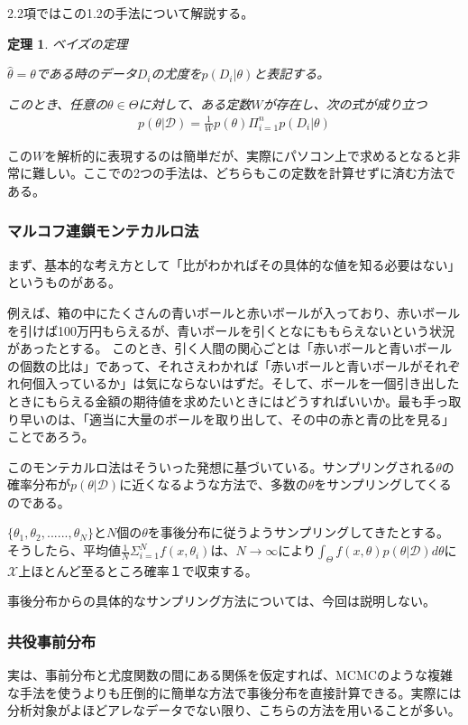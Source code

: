 \documentclass[dvipdfmx, a4paper]{jsarticle}
\newtheorem{theo}{定理}[section]
\begin{document}
2.2項ではこの1.2の手法について解説する。

\begin{theo}ベイズの定理

$\hat{\theta}=\theta$である時のデータ$D_i$の尤度を$p(D_i|\theta)$と表記する。

このとき、任意の$\theta\in\Theta$に対して、ある定数$W$が存在し、次の式が成り立つ
\begin{align}
p(\theta|\mathcal{D})=\frac{1}{W}p(\theta)\Pi^n_{i=1}p(D_i|\theta)
\end{align}
\end{theo}
この$W$を解析的に表現するのは簡単だが、実際にパソコン上で求めるとなると非常に難しい。ここでの2つの手法は、どちらもこの定数を計算せずに済む方法である。
\subsubsection{マルコフ連鎖モンテカルロ法}
まず、基本的な考え方として「比がわかればその具体的な値を知る必要はない」というものがある。

例えば、箱の中にたくさんの青いボールと赤いボールが入っており、赤いボールを引けば100万円もらえるが、青いボールを引くとなにももらえないという状況があったとする。
このとき、引く人間の関心ごとは「赤いボールと青いボールの個数の比は」であって、それさえわかれば「赤いボールと青いボールがそれぞれ何個入っているか」は気にならないはずだ。そして、ボールを一個引き出したときにもらえる金額の期待値を求めたいときにはどうすればいいか。最も手っ取り早いのは、「適当に大量のボールを取り出して、その中の赤と青の比を見る」ことであろう。

このモンテカルロ法はそういった発想に基づいている。サンプリングされる$\theta$の確率分布が$p(\theta|\mathcal{D})$に近くなるような方法で、多数の$\theta$をサンプリングしてくるのである。

$\{\theta_1,\theta_2,......,\theta_N\}$と$N$個の$\theta$を事後分布に従うようサンプリングしてきたとする。そうしたら、平均値$\frac{1}{N}\Sigma^N_{i=1}f(x,\theta_i)$は、$N\to\infty$により$\int_\Theta f(x,\theta)p(\theta|\mathcal{D})d\theta$に$\mathcal{X}$上ほとんど至るところ確率１で収束する。

事後分布からの具体的なサンプリング方法については、今回は説明しない。


\subsubsection{共役事前分布}
実は、事前分布と尤度関数の間にある関係を仮定すれば、MCMCのような複雑な手法を使うよりも圧倒的に簡単な方法で事後分布を直接計算できる。実際には分析対象がよほどアレなデータでない限り、こちらの方法を用いることが多い。
\end{document}
